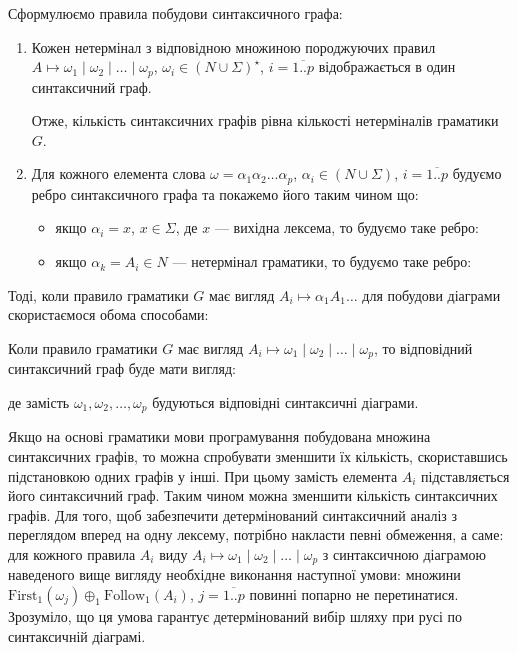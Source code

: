 Сформулюємо правила побудови синтаксичного графа:
\begin{enumerate}
	\item Кожен нетермінал з відповідною множиною породжуючих правил $A \mapsto \omega_1 \mid \omega_2 \mid \ldots \mid \omega_p$, $\omega_i \in (N \cup \Sigma)^\star$, $i = \overline{1..p}$ відображається в один синтаксичний граф. \medskip

	Отже, кількість синтаксичних графів рівна кількості нетерміналів граматики $G$.

	\item Для кожного елемента слова $\omega = \alpha_1 \alpha_2 \ldots \alpha_p$, $\alpha_i \in (N \cup \Sigma)$, $i = \overline{1..p}$ будуємо ребро синтаксичного графа та покажемо його таким чином що:
	\begin{itemize}
		\item якщо $\alpha_i = x$, $x \in \Sigma$, де $x$ --- вихідна лексема, то будуємо таке ребро:
		\begin{figure}[H]
			\centering
			
		\end{figure}

		\item якщо $\alpha_k = A_i \in N$ --- нетермінал граматики, то будуємо таке ребро:
		\begin{figure}[H]
			\centering
			
		\end{figure}
	\end{itemize}
\end{enumerate}

Тоді, коли правило граматики $G$ має вигляд $A_i \mapsto \alpha_1 A_1 \ldots$ для побудови діаграми скористаємося обома способами:
\begin{figure}[H]
	\centering
	
\end{figure}

Коли правило граматики $G$ має вигляд $A_i \mapsto \omega_1 \mid \omega_2 \mid \ldots \mid \omega_p$, то відповідний синтаксичний граф буде мати вигляд:
\begin{figure}[H]
	\centering
	
\end{figure}
де замість $\omega_1, \omega_2, \ldots, \omega_p$ будуються відповідні синтаксичні діаграми. \medskip

Якщо на основі граматики мови програмування побудована множина синтаксичних графів, то можна спробувати зменшити їх кількість, скориставшись підстановкою одних графів у інші. При цьому замість елемента $A_i$ підставляється його синтаксичний граф. Таким чином можна зменшити кількість синтаксичних графів. Для того, щоб забезпечити детермінований синтаксичний аналіз з переглядом вперед на одну лексему, потрібно накласти певні обмеження, а саме: для кожного правила $A_i$ виду  $A_i \mapsto \omega_1 \mid \omega_2 \mid \ldots \mid \omega_p$ з синтаксичною діаграмою наведеного вище вигляду необхідне виконання наступної умови: множини $\text{First}_1(\omega_j) \oplus_1 \text{Follow}_1 (A_i)$, $j = \overline{1..p}$ повинні попарно не перетинатися. Зрозуміло, що ця умова гарантує детермінований вибір шляху при русі по синтаксичній діаграмі.

